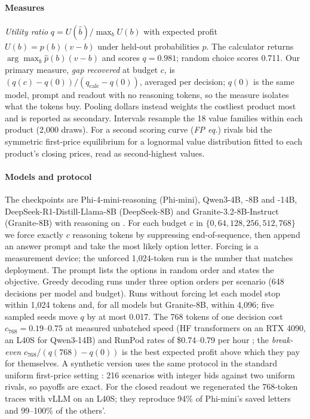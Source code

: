 \documentclass[sigconf,review,anonymous]{acmart}
\begin{document}
\paragraph{Measures}
\emph{Utility ratio} $q=U(\hat b)/\max_b U(b)$ with expected profit $U(b)=p(b)(v-b)$ under held-out probabilities $p$. The calculator returns $\arg\max_b \hat p(b)(v-b)$ and scores $q=0.981$; random choice scores 0.711. Our primary measure, \emph{gap recovered} at budget $c$, is $(q(c)-q(0))/(q_{\text{calc}}-q(0))$, averaged per decision; $q(0)$ is the same model, prompt and readout with no reasoning tokens, so the measure isolates what the tokens buy. Pooling dollars instead weights the costliest product most and is reported as secondary. Intervals resample the 18 value families within each product (2{,}000 draws). For a second scoring curve (\emph{FP eq.}) rivals bid the symmetric first-price equilibrium for a lognormal value distribution fitted to each product's closing prices, read as second-highest values.

\paragraph{Models and protocol}
The checkpoints are Phi-4-mini-reasoning (Phi-mini), Qwen3-4B, -8B and -14B, DeepSeek-R1-Distill-\allowbreak Llama-8B (DeepSeek-8B) and Granite-3.2-8B-\allowbreak Instruct (Granite-8B) with reasoning on \cite{microsoft2025phireasoning,yang2025qwen3,guo2025deepseek,ibmgranite2025}. For each budget $c$ in $\{0,\allowbreak 64,\allowbreak 128,\allowbreak 256,\allowbreak 512,\allowbreak 768\}$ we force exactly $c$ reasoning tokens by suppressing end-of-sequence, then append an answer prompt and take the most likely option letter. Forcing is a measurement device; the unforced 1{,}024-token run is the number that matches deployment. The prompt lists the options in random order and states the objective. Greedy decoding runs under three option orders per scenario (648 decisions per model and budget). Runs without forcing let each model stop within 1{,}024 tokens and, for all models but Granite-8B, within 4{,}096; five sampled seeds move $q$ by at most 0.017. The 768 tokens of one decision cost $c_{768}=0.19$--$0.75$\textcent{} at measured unbatched speed (HF transformers on an RTX 4090, an L40S for Qwen3-14B) and RunPod rates of \$0.74--0.79 per hour \cite{runpod2026pricing}; the \emph{break-even} $c_{768}/(q(768)-q(0))$ is the best expected profit above which they pay for themselves. A synthetic version uses the same protocol in the standard uniform first-price setting \cite{krishna2010auction}: 216 scenarios with integer bids against two uniform rivals, so payoffs are exact. For the closed readout we regenerated the 768-token traces with vLLM on an L40S; they reproduce 94\% of Phi-mini's saved letters and 99--100\% of the others'.
\end{document}
